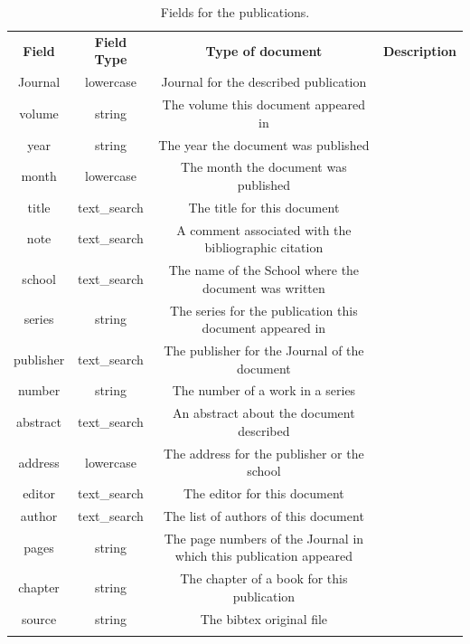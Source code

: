\begin{table}
    \centering
    \begin{tabular*}{0.9\textwidth}{@{\extracolsep{\fill}} | c | c | c | p{} |}
      \hhline{|-|-|-|-|}
      \textbf{Field} & \textbf{Field Type} & \textbf{Type of document} & \textbf{Description} \\ \hhline{|=|=|=|}
      Journal & lowercase &  Journal for the described publication \\ \hhline{|-|-|-|}
      volume & string & The volume this document appeared in \\ \hhline{|-|-|-|}
      year & string & The year the document was published \\ \hhline{|-|-|-|}
      month & lowercase & The month the document was published \\ \hhline{|-|-|-|}
      title & text\_search & The title for this document \\ \hhline{|-|-|-|}
      note & text\_search & A comment associated with the bibliographic citation \\ \hhline{|-|-|-|}
      school & text\_search & The name of the School where the document was written \\ \hhline{|-|-|-|}
      series & string & The series for the publication this document appeared in \\ \hhline{|-|-|-|}
      publisher & text\_search & The publisher for the Journal of the document \\ \hhline{|-|-|-|}
      number & string & The number of a work in a series \\ \hhline{|-|-|-|}
      abstract & text\_search & An abstract about the document described \\ \hhline{|-|-|-|}
      address & lowercase & The address for the publisher or the school \\ \hhline{|-|-|-|}
      editor & text\_search & The editor for this document \\ \hhline{|-|-|-|}
      author & text\_search & The list of authors of this document \\ \hhline{|-|-|-|}
      pages & string & The page numbers of the Journal in which this publication appeared \\ \hhline{|-|-|-|}
      chapter & string & The chapter of a book for this publication \\ \hhline{|-|-|-|}
      source & string & The bibtex original file \\ \hhline{|-|-|-|}
      \end{tabular*}
    \caption{Fields for the publications.}
    \label{tab:schema-gsifields-pubs}
\end{table}

